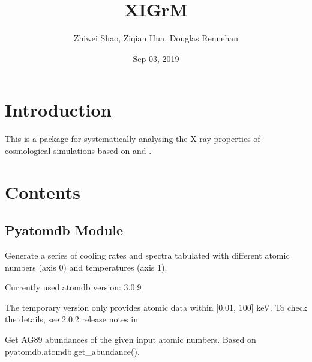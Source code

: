\documentclass[letterpaper,10pt,english]{sphinxmanual}
\title{XIGrM}
\date{Sep 03, 2019}
\author{Zhiwei Shao, Ziqian Hua, Douglas Rennehan}
\begin{document}
\pagestyle{empty}
\sphinxmaketitle
\pagestyle{plain}
\sphinxtableofcontents
\pagestyle{normal}
\label{\detokenize{index::doc}}



\chapter{Introduction}
\label{\detokenize{index:introduction}}
This is a package for systematically analysing the X-ray properties
of cosmological simulations based on 
and .


\chapter{Contents}
\label{\detokenize{index:contents}}

\section{Pyatomdb Module}
\label{\detokenize{prepare_pyatomdb:module-modules.prepare_pyatomdb}}\label{\detokenize{prepare_pyatomdb:pyatomdb-module}}\label{\detokenize{prepare_pyatomdb::doc}}
Generate a series of cooling rates and spectra 
tabulated with different atomic numbers (axis 0) 
and temperatures (axis 1).

Currently used atomdb version: 3.0.9

The temporary version only provides atomic data
within {[}0.01, 100{]} keV. To check the details, 
see 2.0.2 release notes in 

\begin{fulllineitems}
\label{\detokenize{prepare_pyatomdb:modules.prepare_pyatomdb.AG89_abundances}}
Get AG89 abundances of the given input atomic numbers.
Based on pyatomdb.atomdb.get\_abundance().

\end{fulllineitems}

\end{document}
